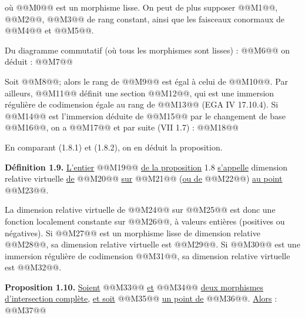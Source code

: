 
où @@M0@@ est un
morphisme lisse. On peut de plus supposer @@M1@@, @@M2@@, @@M3@@ de rang constant, ainsi que les faisceaux conormaux de @@M4@@ et @@M5@@.

Du diagramme commutatif (où tous les morphismes sont lisses) :
@@M6@@
on déduit :
@@M7@@

Soit @@M8@@; alors le rang de @@M9@@ est égal à celui de @@M10@@. Par ailleurs, @@M11@@ définit une section @@M12@@, qui est une immersion régulière de codimension égale au rang de @@M13@@ (EGA IV 17.10.4). Si @@M14@@ est l'immersion déduite de @@M15@@ par le changement de base @@M16@@, on a @@M17@@ et par suite (VII 1.7) :
@@M18@@

En comparant (1.8.1) et (1.8.2), on en déduit la proposition.

\textbf{Définition 1.9.} \uline{L'entier} @@M19@@ \uline{de la proposition} 1.8 \uline{s'appelle} dimension relative virtuelle \uline{de} @@M20@@ \uline{sur} @@M21@@ (\uline{ou de} @@M22@@) \uline{au point} @@M23@@.

La dimension relative virtuelle de @@M24@@ sur @@M25@@ est donc une fonction localement constante sur @@M26@@, à valeurs entières (positives ou négatives). Si @@M27@@ est un morphisme lisse de dimension relative @@M28@@, sa dimension relative virtuelle est @@M29@@. Si @@M30@@ est une immersion régulière de codimension @@M31@@, sa dimension relative virtuelle est @@M32@@.

\textbf{Proposition 1.10.} \uline{Soient} @@M33@@ \uline{et} @@M34@@ \uline{deux morphismes d'intersection complète}, \uline{et soit} @@M35@@ \uline{un point de} @@M36@@. \uline{Alors} :
@@M37@@

